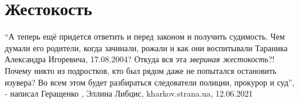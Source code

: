  
 
 
 
 
\chapter{Жестокость}

\enquote{А теперь ещё придется ответить и перед законом и получить судимость.
Чем думали его родители, когда зачинали, рожали и как они воспитывали Тараника
Александра Игоревича, 17.08.2004? Откуда вся эта \emph{звериная жестокость}?!
Почему никто из подростков, кто был рядом даже не попытался остановить изувера?
Во всем этом будет разбираться следователи полиции, прокурор и суд}, - написал
Геращенко
, 
Эллина Либцис, kharkov.strana.ua, 12.06.2021

